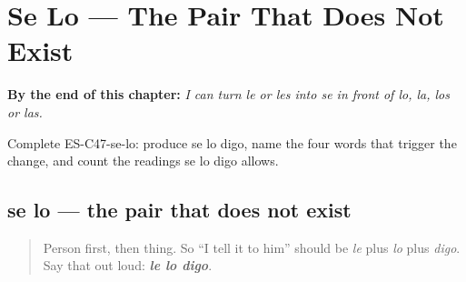 
\chapter{Se Lo --- The Pair That Does Not Exist}
\label{ch:se-for-le}

\begin{chapteropening}
\textbf{By the end of this chapter:} \emph{I can turn le or les into se in front of lo, la, los or las.}

Complete ES-C47-se-lo: produce se lo digo, name the four words that trigger the change, and count the readings se lo digo allows.
\end{chapteropening}

\section[se lo]{se lo — the pair that does not exist}

\label{lesson:ES-C47-se-lo}



\begin{quote}
Person first, then thing. So \textquotedblleft{}I tell it to him\textquotedblright{} should be \emph{le} plus \emph{lo} plus \emph{digo}. Say that out loud: \emph{\textbf{le lo digo}}.
\end{quote}

